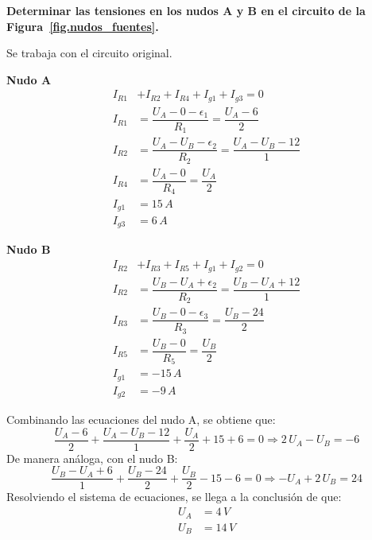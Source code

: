 	\begin{example}\label{ex.nudos_modificados}
	    \textbf{Determinar las tensiones en los nudos A y B en el circuito de la Figura~\ref{fig.nudos_fuentes}.}
	    
	    Se trabaja con el circuito original. 
	    
	    \textbf{Nudo A}
	    \begin{align*}
	        I_{R1}& + I_{R2} + I_{R4} + I_{g1} + I_{g3} = 0\\
	        I_{R1}&=\dfrac{U_A-0-\epsilon_1}{R_1}=\dfrac{U_A-6}{2}\\
	        I_{R2}&=\dfrac{U_A-U_B-\epsilon_2}{R_2}=\dfrac{U_A-U_B-12}{1}\\
	        I_{R4}&=\dfrac{U_A-0}{R_4}=\dfrac{U_A}{2}\\
	        I_{g1}&=15\,A\\
	        I_{g3}&=6\,A
	    \end{align*}
	    
	    \textbf{Nudo B}
	    \begin{align*}
	        I_{R2}& + I_{R3} + I_{R5} + I_{g1} + I_{g2} = 0\\
	        I_{R2}&=\dfrac{U_B-U_A+\epsilon_2}{R_2}=\dfrac{U_B-U_A+12}{1}\\
	        I_{R3}&=\dfrac{U_B-0-\epsilon_3}{R_3}=\dfrac{U_B-24}{2}\\
	        I_{R5}&=\dfrac{U_B-0}{R_5}=\dfrac{U_B}{2}\\
	        I_{g1}&=-15\,A\\
	        I_{g2}&=-9\,A
	    \end{align*}
	    
	    Combinando las ecuaciones del nudo A, se obtiene que:
	    \begin{equation*}
	        \dfrac{U_A-6}{2}+\dfrac{U_A-U_B-12}{1}+\dfrac{U_A}{2}+15+6=0\Rightarrow 2\,U_A-U_B=-6
	    \end{equation*}
	    De manera análoga, con el nudo B: 
	    \begin{equation*}
	        \dfrac{U_B-U_A+6}{1}+\dfrac{U_B-24}{2}+\dfrac{U_B}{2}-15-6=0\Rightarrow -U_A+2\,U_B=24
	    \end{equation*}
	    Resolviendo el sistema de ecuaciones, se llega a la conclusión de que: 
	    \begin{align*}
	        U_A&=4\,V\\
	        U_B&=14\,V
	    \end{align*}

	\end{example}
	
